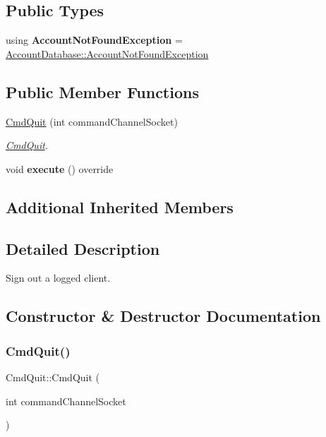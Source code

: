 \subsection*{Public Types}
\begin{DoxyCompactItemize}
\item 
\mbox{\label{classCmdQuit_ae65ce68209e37afaa75e5a97c6202a1a}} 
using {\bfseries Account\+Not\+Found\+Exception} = \hyperlink{structAccountDatabase_1_1AccountNotFoundException}{Account\+Database\+::\+Account\+Not\+Found\+Exception}
\end{DoxyCompactItemize}
\subsection*{Public Member Functions}
\begin{DoxyCompactItemize}
\item 
\hyperlink{classCmdQuit_abab586b6df59ad1fcb59150ca2b72d97}{Cmd\+Quit} (int command\+Channel\+Socket)
\begin{DoxyCompactList}\small\item\em \hyperlink{classCmdQuit}{Cmd\+Quit}. \end{DoxyCompactList}\item 
\mbox{\label{classCmdQuit_acf50df91ad695a40a449890300344f4b}} 
void {\bfseries execute} () override
\end{DoxyCompactItemize}
\subsection*{Additional Inherited Members}


\subsection{Detailed Description}
Sign out a logged client. 

\subsection{Constructor \& Destructor Documentation}
\mbox{\label{classCmdQuit_abab586b6df59ad1fcb59150ca2b72d97}} 
\subsubsection{\texorpdfstring{Cmd\+Quit()}{CmdQuit()}}
{\footnotesize\ttfamily Cmd\+Quit\+::\+Cmd\+Quit (\begin{DoxyParamCaption}\item[{int}]{command\+Channel\+Socket }\end{DoxyParamCaption})}




